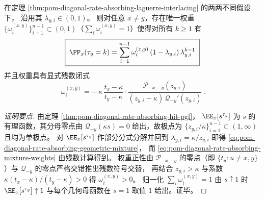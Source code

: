 

\begin{theorem}\label{thm:pom-diagonal-rate-absorbing-geometric-mixture}
在定理 \ref{thm:pom-diagonal-rate-absorbing-laguerre-interlacing} 的两两不同假设下，
沿用其 \(\lambda_{y,i}\in(0,1)\)。
则对任意 \(x\ne y\)，存在唯一权重 \(\{\omega_i^{(x,y)}\}_{i=1}^{n-1}\subset(0,1)\)（\(\sum_i\omega_i^{(x,y)}=1\)）使得对所有 \(k\ge 1\) 有
\begin{equation}\label{eq:pom-diagonal-rate-absorbing-geometric-mixture}
\boxed{\;
\PP_x(\tau_y=k)
=\sum_{i=1}^{n-1}\omega_i^{(x,y)}\,(1-\lambda_{y,i})\,\lambda_{y,i}^{k-1}\;}
\end{equation}
并且权重具有显式残数闭式
\begin{equation}\label{eq:pom-diagonal-rate-absorbing-mixture-weights}
\boxed{\;
\omega_i^{(x,y)}
=
-\,\kappa\,\frac{t_x-\kappa}{t_y-\kappa}\cdot
\frac{\mathcal P_{-x,-y}(z_{y,i})}{(z_{y,i}-\kappa)\,\mathcal Q_{-y}'(z_{y,i})}\; } .
\end{equation}
\end{theorem}
\begin{proof}[证明要点]
由定理 \ref{thm:pom-diagonal-rate-absorbing-hit-pgf}，
\(
\EE_x[s^{\tau_y}]
\)
为 \(s\) 的有理函数，其分母零点由 \(\mathcal Q_{-y}(\kappa s)=0\) 给出，故极点为 \(\{z_{y,i}/\kappa\}_{i=1}^{n-1}\subset(1,\infty)\) 且均为单极点。
对 \(\EE_x[s^{\tau_y}]\) 作部分分式分解并回到 \(\lambda_{y,i}=\kappa/z_{y,i}\) 即得 \eqref{eq:pom-diagonal-rate-absorbing-geometric-mixture}，
而 \eqref{eq:pom-diagonal-rate-absorbing-mixture-weights} 由残数计算得到。
权重正性由 \(\mathcal P_{-x,-y}\) 的零点（即 \(\{t_u:u\ne x,y\}\)）与 \(\mathcal Q_{-y}\) 的零点严格交错推出残数符号交替，
再结合 \(z_{y,i}>\kappa\) 与系数 \(\kappa(t_x-\kappa)/(t_y-\kappa)>0\) 得 \(\omega_i^{(x,y)}>0\)。
归一化 \(\sum_i\omega_i^{(x,y)}=1\) 由 \(s\uparrow 1\) 时 \(\EE_x[s^{\tau_y}]\uparrow 1\) 与每个几何母函数在 \(s=1\) 取值 \(1\) 给出。证毕。
\end{proof}

